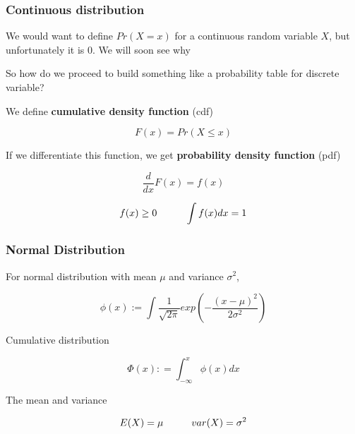 \documentclass{beamer}\usepackage[]{graphicx}\usepackage[]{color}
\begin{document}
\begin{frame}[fragile]

\frametitle{Continuous distribution}

We would want to define $Pr(X=x)$ for a continuous random variable $X$, but unfortunately it is $0$. We will soon see why \pause \newline

So how do we proceed to build something like a probability table for discrete variable?

We define \textbf{cumulative density function} (cdf)

$$ F(x) = Pr (X \leq x) $$

If we differentiate this function, we get \textbf{probability density function} (pdf)

$$ \frac{d}{dx} F(x) = f(x) $$

$$ f(x) \geq 0 \hspace {1 cm} \int f(x) dx = 1 $$

\end{frame}

\begin{frame}[fragile]

\frametitle{Normal Distribution}

For normal distribution with mean $\mu$ and variance $\sigma^2$, 

$$ \phi(x) := \int \frac{1}{\sqrt{2 \pi}} exp \left (-\frac{(x-\mu)^2}{2 \sigma^2} \right ) $$

Cumulative distribution

$$ \Phi(x) : = \int_{-\infty}^{x} \phi(x) dx $$

The mean and variance 

$$ E(X) = \mu  \hspace{1 cm} var(X) = \sigma^2 $$

\end{frame}
\end{document}
